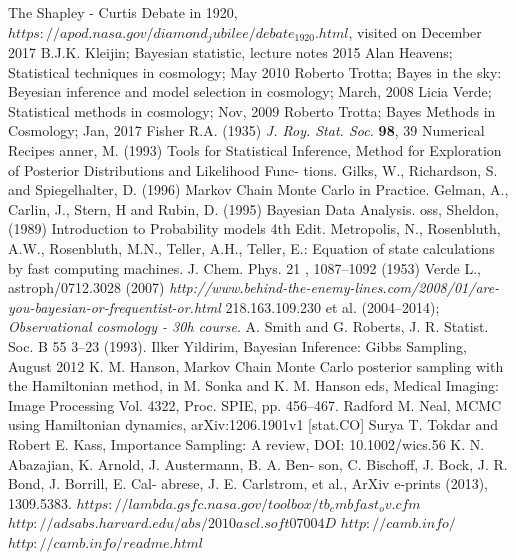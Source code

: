\documentclass[onecolumn,           %
               showpacs,            %
               preprintnumbers,     %
               aps,                 %
               prl,          	    %
               letterpaper,             %
               superscriptaddress,      %
               nofootinbib,         %
               tightenlines,        %
               floats,floatfix      %
               ,usenatbib,
               ]{revtex4-1}
\begin{document}
\begin{thebibliography}{9}
 The Shapley - Curtis Debate in 1920, $https://apod.nasa.gov/diamond_jubilee/debate_1920.html$, visited on December 2017
B.J.K. Kleijin; Bayesian statistic, lecture notes 2015
 Alan Heavens; Statistical techniques in cosmology; May 2010
 Roberto Trotta; Bayes in the sky: Beyesian inference and model selection in cosmology; March, 2008
 Licia Verde; Statistical methods in cosmology; Nov, 2009
Roberto Trotta; Bayes Methods in Cosmology; Jan, 2017
Fisher R.A. (1935) \textit{J. Roy. Stat. Soc.} \textbf{98}, 39
Numerical Recipes
anner, M. (1993)
Tools for Statistical Inference, Method for
Exploration of Posterior Distributions and Likelihood Func-
tions.
Gilks, W., Richardson, S. and Spiegelhalter, D. (1996)
Markov Chain
Monte Carlo in Practice.
Gelman, A., Carlin, J., Stern, H and Rubin, D. (1995)
Bayesian Data
Analysis.
oss, Sheldon, (1989)
Introduction to Probability models 4th
Edit.
 Metropolis, N., Rosenbluth, A.W., Rosenbluth, M.N., Teller, A.H., Teller, E.: Equation of state
calculations by fast computing machines. J. Chem. Phys.
21
, 1087–1092 (1953)
 Verde L., astroph/0712.3028 (2007)
\textit{http://www.behind-the-enemy-lines.com/2008/01/are-you-bayesian-or-frequentist-or.html}
218.163.109.230 et al. (2004–2014); \textit{Observational cosmology -
30h course}.
 A. Smith and G. Roberts, J. R. Statist. Soc. B
55
3–23 (1993).
 Ilker Yildirim, Bayesian Inference: Gibbs Sampling, August 2012
K. M. Hanson, Markov Chain Monte Carlo posterior sampling with the Hamiltonian method, in M. Sonka and K. M. Hanson eds, Medical Imaging: Image Processing
Vol. 4322, Proc. SPIE, pp. 456–467.
 Radford M. Neal, MCMC using Hamiltonian dynamics, arXiv:1206.1901v1 [stat.CO]
 Surya T. Tokdar and Robert E. Kass, Importance Sampling: A review, DOI: 10.1002/wics.56
%
%
%
%
 K. N. Abazajian, K. Arnold, J. Austermann, B. A. Ben-
son, C. Bischoff, J. Bock, J. R. Bond, J. Borrill, E. Cal-
abrese,  J.  E.  Carlstrom,  et  al.,  ArXiv  e-prints  (2013),
1309.5383.
$https://lambda.gsfc.nasa.gov/toolbox/tb_cmbfast_ov.cfm$
$http://adsabs.harvard.edu/abs/2010ascl.soft07004D$
$http://camb.info/$
$http://camb.info/readme.html$

\end{thebibliography}
\end{document}
